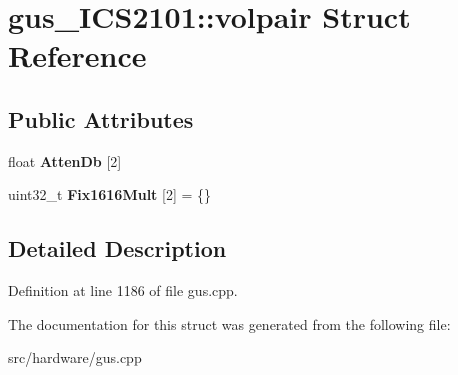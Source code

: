 \hypertarget{structgus__ICS2101_1_1volpair}{\section{gus\-\_\-\-I\-C\-S2101\-:\-:volpair Struct Reference}
\label{structgus__ICS2101_1_1volpair}
}
\subsection*{Public Attributes}
\begin{DoxyCompactItemize}
\item 
\hypertarget{structgus__ICS2101_1_1volpair_a02314a3a3ad17a789bc194f027a55728}{float {\bfseries Atten\-Db} \mbox{[}2\mbox{]}}\label{structgus__ICS2101_1_1volpair_a02314a3a3ad17a789bc194f027a55728}

\item 
\hypertarget{structgus__ICS2101_1_1volpair_a46cbc4d1df89d680f55e3bc2ab41baca}{uint32\-\_\-t {\bfseries Fix1616\-Mult} \mbox{[}2\mbox{]} = \{\}}\label{structgus__ICS2101_1_1volpair_a46cbc4d1df89d680f55e3bc2ab41baca}

\end{DoxyCompactItemize}


\subsection{Detailed Description}


Definition at line 1186 of file gus.\-cpp.



The documentation for this struct was generated from the following file\-:\begin{DoxyCompactItemize}
\item 
src/hardware/gus.\-cpp\end{DoxyCompactItemize}

